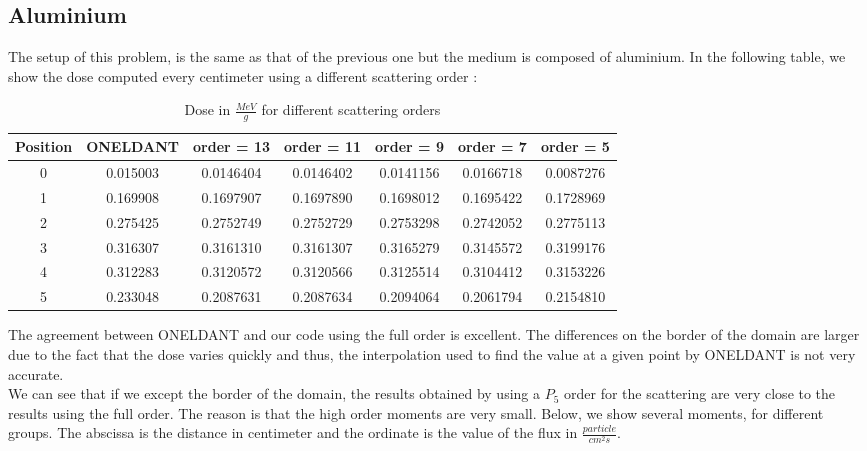 \subsection{Aluminium}
The setup of this problem, is the same as that of the previous one but the medium is
composed of aluminium. In the following table, we show the dose computed every 
centimeter using a different scattering order :
\begin{table}[H]
\begin{center}
\caption{Dose in $\frac{MeV}{g}$ for different scattering orders}
\begin{tabular}{|c|c|c|c|c|c|c|}
\hline
Position & ONELDANT & order = 13 & order = 11 & order = 9 & order = 7 & order = 5 \\
\hline
0 & 0.015003 & 0.0146404 & 0.0146402 & 0.0141156 & 0.0166718 & 0.0087276 \\
1 & 0.169908 & 0.1697907 & 0.1697890 & 0.1698012 & 0.1695422 & 0.1728969 \\
2 & 0.275425 & 0.2752749 & 0.2752729 & 0.2753298 & 0.2742052 & 0.2775113 \\
3 & 0.316307 & 0.3161310 & 0.3161307 & 0.3165279 & 0.3145572 & 0.3199176 \\
4 & 0.312283 & 0.3120572 & 0.3120566 & 0.3125514 & 0.3104412 & 0.3153226 \\
5 & 0.233048 & 0.2087631 & 0.2087634 & 0.2094064 & 0.2061794 & 0.2154810 \\
\hline
\end{tabular}
\end{center}
\end{table}     
The agreement between ONELDANT and our code using the full order is excellent.
The differences on the border of the domain are larger due to the fact that
the dose varies quickly and thus, the interpolation used to find the value at
a given point by ONELDANT is not very accurate.\\ 
We can see that if we except the border of the domain, the results obtained by
using a $P_5$ order for the scattering are very close to the results using the
full order. The reason is that the high order moments are very small. Below,
we show several moments, for different groups. The abscissa is the distance in
centimeter and the ordinate is the value of the flux in $\frac{particle}{cm^2
s}$.

